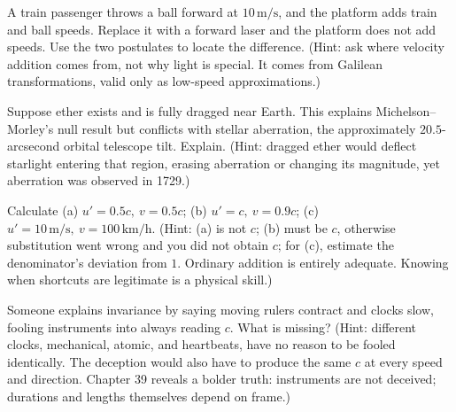 \begin{puzzles}
\item A train passenger throws a ball forward at \(10\,\mathrm{m/s}\), and the platform adds train and ball speeds. Replace it with a forward laser and the platform does not add speeds. Use the two postulates to locate the difference. (Hint: ask where velocity addition comes from, not why light is special. It comes from Galilean transformations, valid only as low-speed approximations.)
\item Suppose ether exists and is fully dragged near Earth. This explains Michelson--Morley's null result but conflicts with stellar aberration, the approximately \(20.5\)-arcsecond orbital telescope tilt. Explain. (Hint: dragged ether would deflect starlight entering that region, erasing aberration or changing its magnitude, yet aberration was observed in 1729.)
\item Calculate (a) \(u'=0.5c,\ v=0.5c\); (b) \(u'=c,\ v=0.9c\); (c) \(u'=10\,\mathrm{m/s},\ v=100\,\mathrm{km/h}\). (Hint: (a) is not \(c\); (b) must be \(c\), otherwise substitution went wrong and you did not obtain \(c\); for (c), estimate the denominator's deviation from \(1\). Ordinary addition is entirely adequate. Knowing when shortcuts are legitimate is a physical skill.)
\item Someone explains invariance by saying moving rulers contract and clocks slow, fooling instruments into always reading \(c\). What is missing? (Hint: different clocks, mechanical, atomic, and heartbeats, have no reason to be fooled identically. The deception would also have to produce the same \(c\) at every speed and direction. Chapter 39 reveals a bolder truth: instruments are not deceived; durations and lengths themselves depend on frame.)
\end{puzzles}
